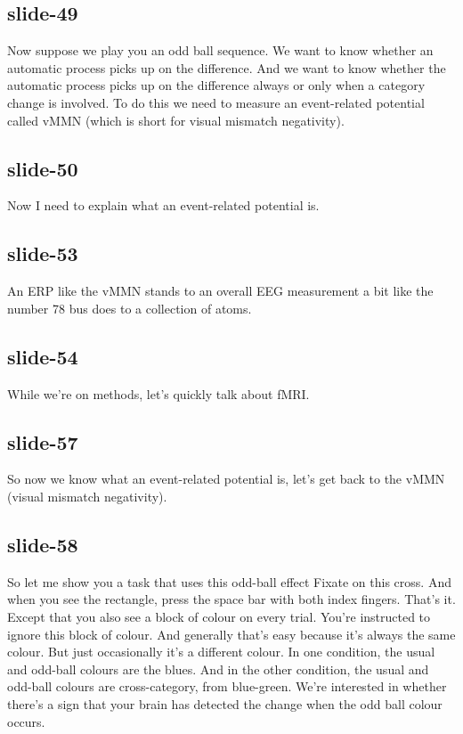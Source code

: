 \documentclass[12pt,\papersize]{extarticle}
\begin{document}
\subsection{slide-49}
Now suppose we play you an odd ball sequence.
We want to know whether an automatic process picks up on the difference.
And we want to know whether the automatic process picks up on the difference always or only when a category change is involved.
To do this we need to measure an event-related potential called vMMN (which is short for visual mismatch negativity).

\subsection{slide-50}
Now I need to explain what an event-related potential is.

\subsection{slide-53}
An ERP like the vMMN stands to an overall EEG measurement a bit like the number 78 bus does to a collection of atoms.

\subsection{slide-54}
While we're on methods, let's quickly talk about fMRI.

\subsection{slide-57}
So now we know what an event-related potential is, let's get back to the vMMN (visual mismatch negativity).

\subsection{slide-58}
So let me show you a task that uses this odd-ball effect
Fixate on this cross.
And when you see the rectangle, press the space bar with both index fingers.
That's it.
Except that you also see a block of colour on every trial.
You're instructed to ignore this block of colour.
And generally that's easy because it's always the same colour.
But just occasionally it's a different colour.
In one condition, the usual and odd-ball colours are the blues.
And in the other condition, the usual and odd-ball colours are cross-category, from blue-green.
We're interested in whether there's a sign that your brain has detected the change when the odd ball colour occurs.
\end{document}
